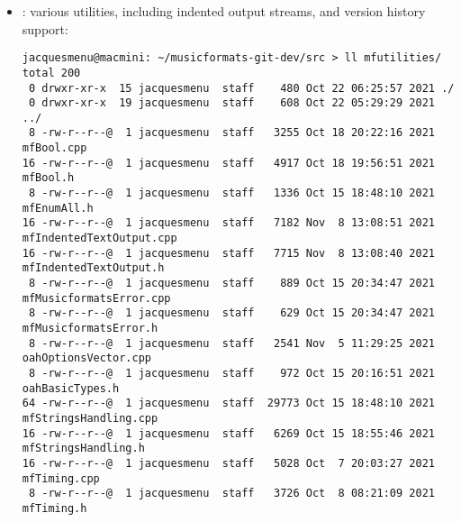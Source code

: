 \begin{itemize}
\item {} : various utilities, including indented output streams, and version history support:%
\begin{lstlisting}[language=Terminal]
jacquesmenu@macmini: ~/musicformats-git-dev/src > ll mfutilities/
total 200
 0 drwxr-xr-x  15 jacquesmenu  staff    480 Oct 22 06:25:57 2021 ./
 0 drwxr-xr-x  19 jacquesmenu  staff    608 Oct 22 05:29:29 2021 ../
 8 -rw-r--r--@  1 jacquesmenu  staff   3255 Oct 18 20:22:16 2021 mfBool.cpp
16 -rw-r--r--@  1 jacquesmenu  staff   4917 Oct 18 19:56:51 2021 mfBool.h
 8 -rw-r--r--@  1 jacquesmenu  staff   1336 Oct 15 18:48:10 2021 mfEnumAll.h
16 -rw-r--r--@  1 jacquesmenu  staff   7182 Nov  8 13:08:51 2021 mfIndentedTextOutput.cpp
16 -rw-r--r--@  1 jacquesmenu  staff   7715 Nov  8 13:08:40 2021 mfIndentedTextOutput.h
 8 -rw-r--r--@  1 jacquesmenu  staff    889 Oct 15 20:34:47 2021 mfMusicformatsError.cpp
 8 -rw-r--r--@  1 jacquesmenu  staff    629 Oct 15 20:34:47 2021 mfMusicformatsError.h
 8 -rw-r--r--@  1 jacquesmenu  staff   2541 Nov  5 11:29:25 2021 oahOptionsVector.cpp
 8 -rw-r--r--@  1 jacquesmenu  staff    972 Oct 15 20:16:51 2021 oahBasicTypes.h
64 -rw-r--r--@  1 jacquesmenu  staff  29773 Oct 15 18:48:10 2021 mfStringsHandling.cpp
16 -rw-r--r--@  1 jacquesmenu  staff   6269 Oct 15 18:55:46 2021 mfStringsHandling.h
16 -rw-r--r--@  1 jacquesmenu  staff   5028 Oct  7 20:03:27 2021 mfTiming.cpp
 8 -rw-r--r--@  1 jacquesmenu  staff   3726 Oct  8 08:21:09 2021 mfTiming.h
\end{lstlisting}


\end{itemize}
